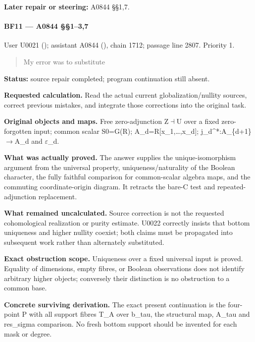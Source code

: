 \textbf{Later repair or steering:} A0844 §§1,7.

\paragraph{BF11 --- A0844 §§1--3,7}\label{bf11-a0844-137}

User U0021 (\protect{});
assistant A0844 (\protect{}),
chain 1712; passage line 2807. Priority 1.

\begin{quote}
My error was to substitute
\end{quote}

\textbf{Status:} source repair completed; program continuation still
absent.

\textbf{Requested calculation.} Read the actual current
globalization/nullity sources, correct previous mistakes, and integrate
those corrections into the original task.

\textbf{Original objects and maps.} Free zero-adjunction
Z\allowbreak{}\ensuremath{⊣}\allowbreak{}U over a fixed zero-forgotten
input; common scalar S0=G(R); A\_d=R{[}x\_1,\ldots,x\_d{]};
j\_d\textasciicircum{}*:A\_\{d+1\}\allowbreak{}\ensuremath{→}\allowbreak{}A\_d
and \allowbreak{}\ensuremath{ε}\allowbreak{}\_d.

\textbf{What was actually proved.} The answer supplies the
unique-isomorphism argument from the universal property,
uniqueness/naturality of the Boolean character, the fully faithful
comparison for common-scalar algebra maps, and the commuting
coordinate-origin diagram. It retracts the bare-C test and
repeated-adjunction replacement.

\textbf{What remained uncalculated.} Source correction is not the
requested cohomological realization or purity estimate. U0022 correctly
insists that bottom uniqueness and higher nullity coexist; both claims
must be propagated into subsequent work rather than alternately
substituted.

\textbf{Exact obstruction scope.} Uniqueness over a fixed universal
input is proved. Equality of dimensions, empty fibres, or Boolean
observations does not identify arbitrary higher objects; conversely
their distinction is no obstruction to a common base.

\textbf{Concrete surviving derivation.} The exact present continuation
is the four-point P with all support fibres T\_A over b\_tau, the
structural map, A\_tau and res\_sigma comparison. No fresh bottom
support should be invented for each mask or degree.

